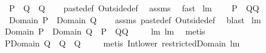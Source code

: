 \begin{isabellebody}
\ \ \ {\isachardoublequoteopen}{\isacharparenleft}P\ {\isacharplus}{\isacharasterisk}\ Q{\isacharparenright}\ {\isacharequal}\ Q{\isachardoublequoteclose}\isanewline
%
\isadelimproof
\ \ %
\endisadelimproof
%
\isatagproof
{}\isamarkupfalse%
\ paste{\isacharunderscore}def\ Outside{\isacharunderscore}def\ \isamarkupfalse%
\ assms\ \isamarkupfalse%
\ fast%
\endisatagproof
{\isafoldproof}%
%
\isadelimproof
\isanewline
%
\endisadelimproof
\isanewline
{}\isamarkupfalse%
\ lm{}{}{}{\isacharcolon}\ \isanewline
\ \ \ {\isachardoublequoteopen}{\isacharparenleft}P\ {\isacharplus}{\isacharasterisk}\ Q{\isacharequal}Q{\isacharparenright}{\isachardoublequoteclose}\ \isanewline
\ \ \ {\isachardoublequoteopen}{\isacharparenleft}Domain\ P\ {\isasymsubseteq}\ Domain\ Q{\isacharparenright}{\isachardoublequoteclose}\isanewline
%
\isadelimproof
\ \ %
\endisadelimproof
%
\isatagproof
{}\isamarkupfalse%
\ assms\ paste{\isacharunderscore}def\ Outside{\isacharunderscore}def\ \isamarkupfalse%
\ blast%
\endisatagproof
{\isafoldproof}%
%
\isadelimproof
\isanewline
%
\endisadelimproof
\isanewline
{}\isamarkupfalse%
\ lm{}{}{}{\isacharcolon}\ \isanewline
\ \ {\isachardoublequoteopen}{\isacharparenleft}Domain\ P\ {\isasymsubseteq}\ Domain\ Q{\isacharparenright}\ {\isacharequal}\ {\isacharparenleft}P\ {\isacharplus}{\isacharasterisk}\ Q{\isacharequal}Q{\isacharparenright}{\isachardoublequoteclose}\ \isanewline
%
\isadelimproof
\ \ %
\endisadelimproof
%
\isatagproof
{}\isamarkupfalse%
\ lm{}{}{}\ lm{}{}{}\ \isamarkupfalse%
\ metis%
\endisatagproof
{\isafoldproof}%
%
\isadelimproof
\isanewline
%
\endisadelimproof
\isanewline
{}\isamarkupfalse%
\ \isanewline
\ \ {\isachardoublequoteopen}{\isacharparenleft}P{\isacharbar}{\isacharbar}{\isacharparenleft}Domain\ Q{\isacharparenright}{\isacharparenright}\ {\isacharplus}{\isacharasterisk}\ Q\ {\isacharequal}\ Q{\isachardoublequoteclose}\ \isanewline
%
\isadelimproof
\ \ %
\endisadelimproof
%
\isatagproof
{}\isamarkupfalse%
\ {\isacharparenleft}metis\ Int{\isacharunderscore}lower{}\ restrictedDomain\ lm{}{}{}{\isacharparenright}%
\endisatagproof
{\isafoldproof}%
%
\isadelimproof
\isanewline
%
\endisadelimproof
\isanewline
{}\isamarkupfalse%

\end{isabellebody}
